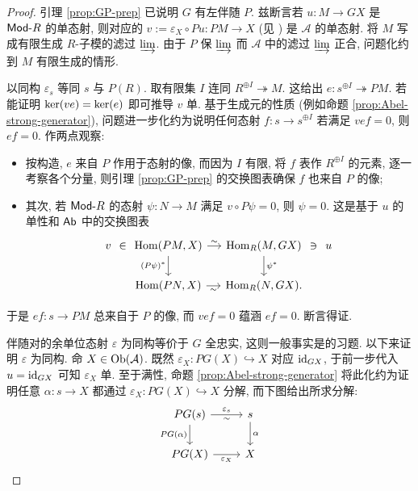 \begin{proof}
	引理 \ref{prop:GP-prep} 已说明 $G$ 有左伴随 $P$. 兹断言若 $u: M \to GX$ 是 $\mathsf{Mod}\text{-}R$ 的单态射, 则对应的 $v := \varepsilon_X \circ Pu : PM \to X$ (见 \cite[(2.5)]{Li1}) 是 $\mathcal{A}$ 的单态射. 将 $M$ 写成有限生成 $R$-子模的滤过 $\varinjlim$. 由于 $P$ 保 $\varinjlim$ 而 $\mathcal{A}$ 中的滤过 $\varinjlim$ 正合, 问题化约到 $M$ 有限生成的情形.
	
	以同构 $\varepsilon_s$ 等同 $s$ 与 $P(R)$. 取有限集 $I$ 连同 $R^{\oplus I} \twoheadrightarrow M$. 这给出 $e: s^{\oplus I} \twoheadrightarrow PM$. 若能证明 $\operatorname{ker}(ve) = \operatorname{ker}(e)$ 即可推导 $v$ 单. 基于生成元的性质 (例如命题 \ref{prop:Abel-strong-generator}), 问题进一步化约为说明任何态射 $f: s \to s^{\oplus I}$ 若满足 $vef = 0$, 则 $ef = 0$. 作两点观察:
	\begin{itemize}
		\item 按构造, $e$ 来自 $P$ 作用于态射的像, 而因为 $I$ 有限, 将 $f$ 表作 $R^{\oplus I}$ 的元素, 逐一考察各个分量, 则引理 \ref{prop:GP-prep} 的交换图表确保 $f$ 也来自 $P$ 的像;
		\item 其次, 若 $\mathsf{Mod}\text{-}R$ 的态射 $\psi: N \to M$ 满足 $v \circ P\psi = 0$, 则 $\psi = 0$. 这是基于 $u$ 的单性和 $\mathsf{Ab}$ 中的交换图表
		\[\begin{tikzcd}[column sep=small]
			v \arrow[phantom, r, "\in" description]& \Hom(PM, X) \arrow[r, "\sim"] \arrow[d, "{(P\psi)^*}"'] & \Hom_R(M, GX) \arrow[d, "{\psi^*}"] & u \arrow[phantom, l, "\ni" description] \\
			& \Hom(PN, X) \arrow[r, "\sim"'] & \Hom_R(N, GX) . &
		\end{tikzcd}\]
	\end{itemize}
	于是 $ef: s \to PM$ 总来自于 $P$ 的像, 而 $vef = 0$ 蕴涵 $ef=0$. 断言得证.
	
	伴随对的余单位态射 $\varepsilon$ 为同构等价于 $G$ 全忠实, 这则一般事实是的习题. 以下来证明 $\varepsilon$ 为同构. 命 $X \in \operatorname{Ob}(\mathcal{A})$. 既然 $\varepsilon_X: PG(X) \hookrightarrow X$ 对应 $\mathrm{id}_{GX}$, 于前一步代入 $u = \mathrm{id}_{GX}$ 可知 $\varepsilon_X$ 单. 至于满性, 命题 \ref{prop:Abel-strong-generator} 将此化约为证明任意 $\alpha: s \to X$ 都通过 $\varepsilon_X: PG(X) \hookrightarrow X$ 分解, 而下图给出所求分解:
	\[\begin{tikzcd}
		PG(s) \arrow[r, "\sim"', "\varepsilon_s"] \arrow[d, "{PG(\alpha)}"'] & s \arrow[d, "\alpha"] \\
		PG(X) \arrow[r, "{\varepsilon_X}"'] & X
	\end{tikzcd}\]
	

\end{proof}
